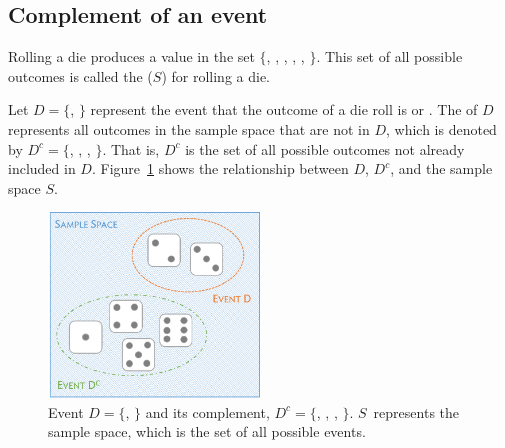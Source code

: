 

\textD{\newpage}


\subsection{Complement of an event}

Rolling a die produces a value in the set $\{$, , , , , $\}$. This set of all possible outcomes is called the  ($S$) for rolling a die. 

Let $D=\{$, $\}$ represent the event that the outcome of a die roll is  or . The  of $D$ represents all outcomes in the sample space that are not in $D$, which is denoted by $D^c = \{$, , , $\}$. That is, $D^c$ is the set of all possible outcomes not already included in $D$. Figure~\ref{fig:complementOfD} shows the relationship between $D$, $D^c$, and the sample space $S$. 

\begin{figure}[hht]
\centering
\includegraphics[width=0.50\textwidth]{ch_probability_oi_biostat/figures/complementOfD/complementOfD}
\caption{Event $D=\{$, $\}$ and its complement, $D^c = \{$, , , $\}$. $S$~represents the sample space, which is the set of all possible events.}
\label{fig:complementOfD}
\end{figure}

